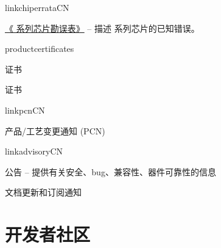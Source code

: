 {\begin{minipage}{\textwidth}
\begin{itemize}
  \ifcsname linkchiperrataCN\endcsname%
    {%
    \item \href{\linkprefix\linkchiperrataCN}{《\chipseries{} 系列芯片勘误表》} --
        {\small 描述 \chipseries{} 系列芯片的已知错误。}
    }%
  \fi%

  \ifcsname productcertificates\endcsname%
    \item 证书\\
        \href{\linkprefix\linkcertificatesCN\productcertificates}{\linkprefix\linkcertificatesCN}
  \else
    \item 证书\\
        \href{\linkprefix\linkcertificatesCN}{\linkprefix\linkcertificatesCN}
  \fi%

  \ifcsname linkpcnCN\endcsname%
    \item \chipseries{} 产品/工艺变更通知 (PCN)\\
        \href{\linkprefix\linkpcnCN}{\linkprefix\linkpcnCN}
  \fi%

  \ifcsname linkadvisoryCN\endcsname%
    \item \chipseries{} 公告 --
        {\small 提供有关安全、bug、兼容性、器件可靠性的信息}\\
        \href{\linkprefix\linkadvisoryCN}{\linkprefix\linkadvisoryCN}
  \fi%

    \item 文档更新和订阅通知\\
        \href{\linkprefix\linkrecentlyupdatedCN}{\linkprefix\linkrecentlyupdatedCN}

\end{itemize}

\end{minipage}



\begin{minipage}{\textwidth}

\section*{开发者社区}


\end{minipage}}
